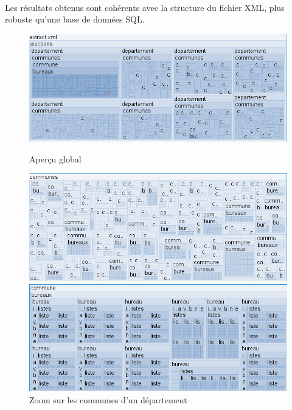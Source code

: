 \paragraph{}Les résultats obtenus sont cohérents avec la structure du fichier XML, plus robuste qu'une base de données SQL.
\iffalse
\begin{figure}[!htb]
   \begin{minipage}{0.48\textwidth}
     \centering
     \includegraphics[width=.9\linewidth]{./src_img/modelisation_doc_1.png}
     \caption{Aperçu global}\label{Fig:doc_global}
   \end{minipage}\hfill
   \begin{minipage}{0.48\textwidth}
     \centering
     \includegraphics[width=.9\linewidth]{./src_img/modelisation_doc_2.png}
     \caption{Zoom sur les communes d'un département}\label{Fig:doc_dep}
   \end{minipage}
      \begin{minipage}{0.48\textwidth}
     \centering
     \includegraphics[width=.9\linewidth]{./src_img/modelisation_doc_3.png}

\end{minipage}
\end{figure}
